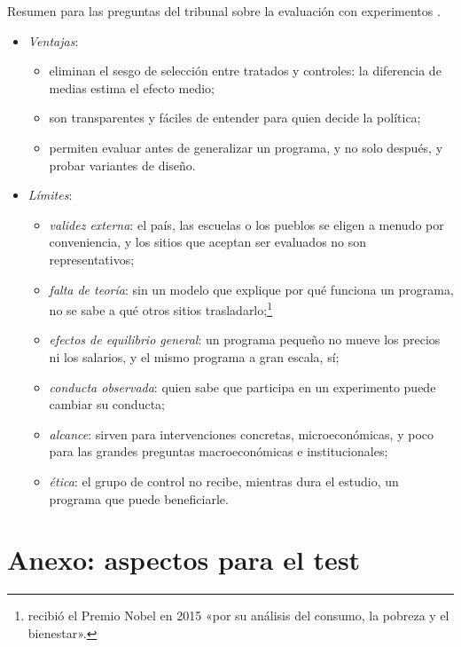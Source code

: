 \documentclass[11pt]{article}
\begin{document}
Resumen para las preguntas del tribunal sobre la evaluación con experimentos  .

\begin{itemize}
\item \emph{Ventajas}:
  \begin{itemize}
  \item eliminan el sesgo de selección entre tratados y controles: la diferencia de medias estima el efecto medio\nocite{AngristPischke2009};
  \item son transparentes y fáciles de entender para quien decide la política;
  \item permiten evaluar antes de generalizar un programa, y no solo después, y probar variantes de diseño.
  \end{itemize}
\item \emph{Límites}:
  \begin{itemize}
  \item \emph{validez externa}: el país, las escuelas o los pueblos se eligen a menudo por conveniencia, y los sitios que aceptan ser evaluados no son representativos\nocite{Allcott2015};
  \item \emph{falta de teoría}: sin un modelo que explique por qué funciona un programa, no se sabe a qué otros sitios trasladarlo\nocite{DeatonCartwright2018};\footnote{ recibió el Premio Nobel en 2015 «por su análisis del consumo, la pobreza y el bienestar»\nocite{Nobel2015Deaton}.}
  \item \emph{efectos de equilibrio general}: un programa pequeño no mueve los precios ni los salarios, y el mismo programa a gran escala, sí;
  \item \emph{conducta observada}: quien sabe que participa en un experimento puede cambiar su conducta;
  \item \emph{alcance}: sirven para intervenciones concretas, microeconómicas, y poco para las grandes preguntas macroeconómicas e institucionales\nocite{Deaton2010};
  \item \emph{ética}: el grupo de control no recibe, mientras dura el estudio, un programa que puede beneficiarle.
  \end{itemize}
\end{itemize}

\section{Anexo: aspectos para el test}\label{anexo:test}
\end{document}
